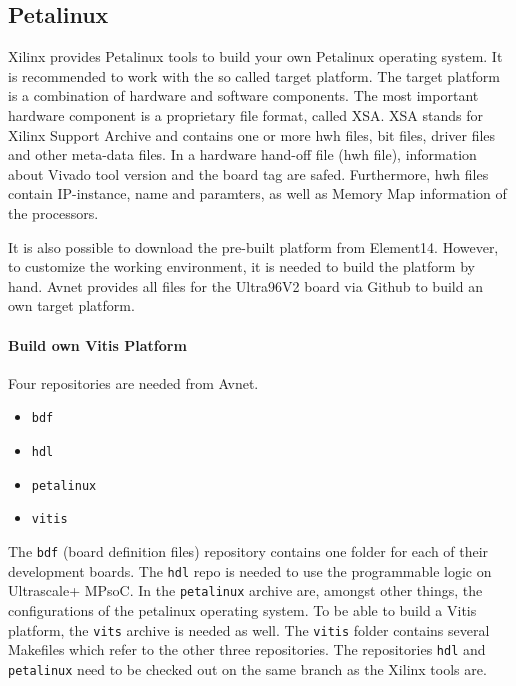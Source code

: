 \subsection{Petalinux}
\label{subsec:embedded_platform:operating_systems:petalinux}

Xilinx provides Petalinux tools to build your own Petalinux operating system.
It is recommended to work with the so called target platform.
The target platform is a combination of hardware and software components.
The most important hardware component is a proprietary file format, called XSA.
XSA stands for Xilinx Support Archive and contains one or more hwh files, bit files, driver files and other meta-data files.
In a hardware hand-off file (hwh file), information about Vivado tool version and the board tag are safed.
Furthermore, hwh files contain IP-instance, name and paramters, as well as Memory Map information of the processors.

It is also possible to download the pre-built platform from Element14.
However, to customize the working environment, it is needed to build the platform by hand.
Avnet provides all files for the Ultra96V2 board via Github to build an own target platform.

\paragraph{Build own Vitis Platform}
Four repositories are needed from Avnet.
\begin{itemize}
	\item \texttt{bdf}
	\item \texttt{hdl}
	\item \texttt{petalinux}
	\item \texttt{vitis}
\end{itemize}

The \texttt{bdf} (board definition files) repository contains one folder for each of their development boards.
The \texttt{hdl} repo is needed to use the programmable logic on Ultrascale+ MPsoC.
In the \texttt{petalinux} archive are, amongst other things, the configurations of the petalinux operating system.
To be able to build a Vitis platform, the \texttt{vits} archive is needed as well.
The \texttt{vitis} folder contains several Makefiles which refer to the other three repositories.
The repositories \texttt{hdl} and \texttt{petalinux} need to be checked out on the same branch as the Xilinx tools are.

